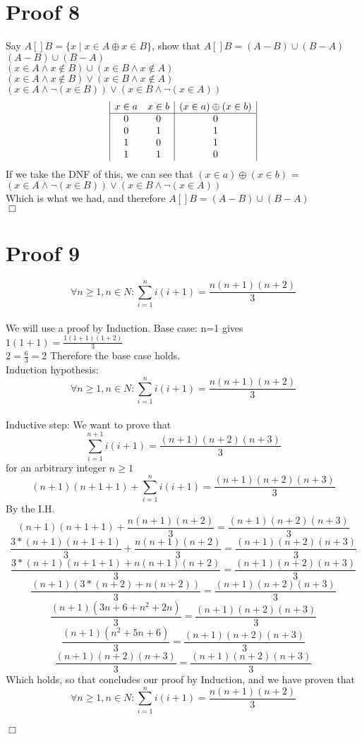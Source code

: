 \documentclass{article}
\begin{document}
\section{Proof 8}
Say $A [] B = \{x \mid x \in A \oplus x \in B\}$, show that $A [] B = (A - B) \cup (B - A)$\\
$(A - B) \cup (B - A)$\\
$(x \in A \land x \not\in B) \cup (x \in B \land  x \not\in A)$\\
$(x \in A \land x \not\in B) \lor (x \in B \land  x \not\in A)$\\
$(x \in A \land \neg(x \in B)) \lor (x \in B \land  \neg(x \in A))$\\

\begin{displaymath}
\begin{array}{ |c c| c|}
x \in a &  x \in b & (x \in a) \oplus (x \in b)\\
\hline
0 & 0 & 0 \\
0 & 1 & 1 \\
1 & 0 & 1 \\
1 & 1 & 0 \\
\end{array}
\end{displaymath}
If we take the DNF of this, we can see that $(x \in a) \oplus (x \in b)$ = $(x \in A \land \neg(x \in B)) \lor (x \in B \land  \neg(x \in A))$\\
Which is what we had, and therefore $A [] B = (A - B) \cup (B - A)$\\
$\Box$

\section{Proof 9}
$$\forall n\geq 1, n \in N : \sum^{n}_{i=1}i(i+1) = \frac{n(n+1)(n+2)}{3}$$\\
We will use a proof by Induction.
Base case: n=1 gives $1(1+1)=\frac{1(1+1)(1+2)}{3}$\\
$2=\frac{6}{3}=2$
Therefore the base case holds.\\

Induction hypothesis: $$\forall n\geq 1, n \in N : \sum^{n}_{i=1}i(i+1) = \frac{n(n+1)(n+2)}{3}$$\\
Inductive step:
We want to prove that $$\sum^{n+1}_{i=1}i(i+1) = \frac{(n+1)(n+2)(n+3)}{3}$$ for an arbitrary integer $n\geq 1$\\
$$(n+1)(n+1+1) + \sum^{n}_{i=1}i(i+1) = \frac{(n+1)(n+2)(n+3)}{3}$$
By the I.H.\\
$$(n+1)(n+1+1) + \frac{n(n+1)(n+2)}{3} = \frac{(n+1)(n+2)(n+3)}{3}$$
$$\frac{3*(n+1)(n+1+1)}{3} + \frac{n(n+1)(n+2)}{3} = \frac{(n+1)(n+2)(n+3)}{3}$$
$$\frac{3*(n+1)(n+1+1)+n(n+1)(n+2)}{3} = \frac{(n+1)(n+2)(n+3)}{3}$$
$$\frac{(n+1)(3*(n+2)+n(n+2))}{3} = \frac{(n+1)(n+2)(n+3)}{3}$$
$$\frac{(n+1)(3n+6+n^2+2n)}{3} = \frac{(n+1)(n+2)(n+3)}{3}$$
$$\frac{(n+1)(n^2+5n+6)}{3} = \frac{(n+1)(n+2)(n+3)}{3}$$
$$\frac{(n+1)(n+2)(n+3)}{3} = \frac{(n+1)(n+2)(n+3)}{3}$$
Which holds, so that concludes our proof by Induction, and we have proven that $$\forall n\geq 1, n \in N : \sum^{n}_{i=1}i(i+1) = \frac{n(n+1)(n+2)}{3}$$\\
$\Box$
\end{document}
